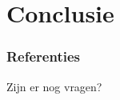 \documentclass{beamer}
\begin{document}
    
\section{Conclusie}


\begin{frame}[allowframebreaks]
  \frametitle{Referenties}
  \printbibliography
\end{frame}


\begin{frame}
\Huge{\centerline{Zijn er nog vragen?}}
\end{frame}

\end{document}
